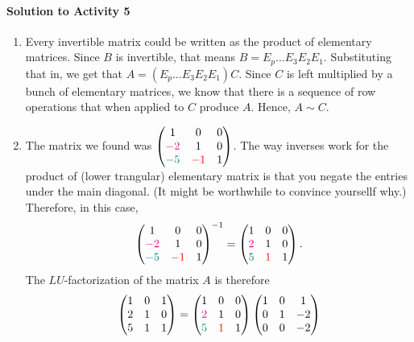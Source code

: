 \begin{enumerate}
\paragraph{Solution to Activity 5}
\begin{enumerate}
	\item Every invertible matrix could be written as the product of elementary matrices. Since \(B\) is invertible, that means \(B = E_p\dots E_3E_2E_1\). Substituting 
		that in, we get that \(A = (E_p\dots E_3E_2E_1)C\). Since \(C\) is left multiplied by a bunch of elementary matrices, we know that there is a sequence of row
		operations that when applied to \(C\) produce \(A\). Hence, \(A \sim C\).
	\item The matrix we found was \(\begin{pmatrix}1 & 0 & 0 \\ \color{magenta}-2 & 1 & 0 \\ \color{teal} -5 & \color{red}-1 & 1 \end{pmatrix}\). The way 
		inverses work for the product of (lower trangular) elementary matrix is that you negate the entries under the main diagonal. (It might be worthwhile to 
		convince yoursellf why.) Therefore, in this case, 
		\[\begin{pmatrix}1 & 0 & 0 \\ \color{magenta}-2 & 1 & 0 \\ \color{teal} -5 & \color{red}-1 & 1 \end{pmatrix}^{-1} 
		= \begin{pmatrix}1 & 0 & 0 \\ \color{magenta}2 & 1 & 0 \\ \color{teal} 5 & \color{red}1 & 1 \end{pmatrix}.\] The \(LU\)-factorization of the matrix 
		\(A\) is therefore \[\begin{pmatrix}1 & 0 & 1 \\ 2 & 1 & 0 \\ 5 & 1 & 1\end{pmatrix} = \begin{pmatrix}1 & 0 & 0 \\ \color{magenta}2 & 1 & 0 \\ \color{teal} 5 & \color{red}1 & 1 \end{pmatrix}\begin{pmatrix}1 & 0 & 1 \\ 0 & 1 & -2 \\ 0 & 0 & -2 \end{pmatrix}\] 


\end{enumerate}
\end{enumerate}
